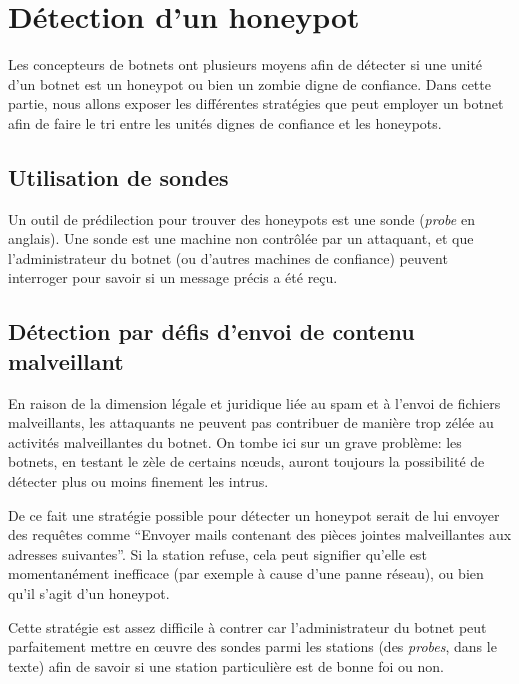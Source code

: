 \section{Détection d'un honeypot}

Les concepteurs de botnets ont plusieurs moyens afin de détecter si une unité
d'un botnet est un honeypot ou bien un zombie digne de confiance.  Dans cette
partie, nous allons exposer les différentes stratégies que peut employer un
botnet afin de faire le tri entre les unités dignes de confiance et les
honeypots.

\subsection{Utilisation de sondes}

Un outil de prédilection pour trouver des honeypots est une sonde
(\textit{probe} en anglais).  Une sonde est une machine non contrôlée par un
attaquant, et que l'administrateur du botnet (ou d'autres machines de
confiance) peuvent interroger pour savoir si un message précis a été reçu.

\subsection{Détection par défis d'envoi de contenu malveillant}

En raison de la dimension légale et juridique liée au spam et à l'envoi de
fichiers malveillants, les attaquants ne peuvent pas contribuer de manière trop
zélée au activités malveillantes du botnet. On tombe ici sur un grave problème:
les botnets, en testant le zèle de certains nœuds, auront toujours la
possibilité de détecter plus ou moins finement les intrus.

De ce fait une stratégie possible pour détecter un honeypot serait de lui
envoyer des requêtes comme ``Envoyer  mails contenant des pièces
jointes malveillantes aux adresses suivantes''. Si la station refuse, cela peut
signifier qu'elle est momentanément inefficace (par exemple à cause d'une panne
réseau), ou bien qu'il s'agit d'un honeypot.

Cette stratégie est assez difficile à contrer car l'administrateur du botnet
peut parfaitement mettre en œuvre des sondes parmi les stations (des
\textit{probes}, dans le texte) afin de savoir si une station particulière est
de bonne foi ou non.

